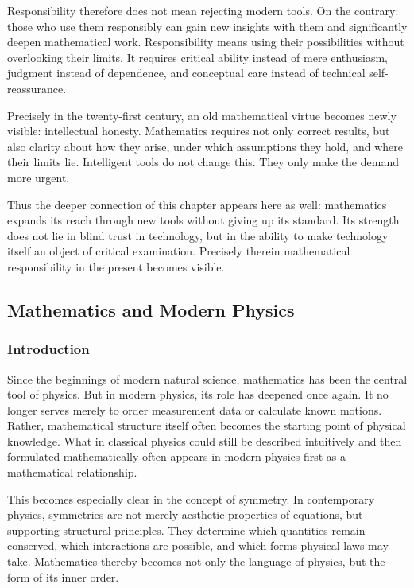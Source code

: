 Responsibility therefore does not mean rejecting modern tools.
On the contrary:
those who use them responsibly
can gain new insights with them
and significantly deepen mathematical work.
Responsibility means using their possibilities
without overlooking their limits.
It requires critical ability instead of mere enthusiasm,
judgment instead of dependence,
and conceptual care instead of technical self-reassurance.

Precisely in the twenty-first century,
an old mathematical virtue becomes newly visible:
intellectual honesty.
Mathematics requires not only correct results,
but also clarity about how they arise,
under which assumptions they hold,
and where their limits lie.
Intelligent tools do not change this.
They only make the demand more urgent.

Thus the deeper connection of this chapter appears here as well:
mathematics expands its reach through new tools
without giving up its standard.
Its strength does not lie in blind trust in technology,
but in the ability to make technology itself
an object of critical examination.
Precisely therein mathematical responsibility in the present becomes visible.


\subsection{Mathematics and Modern Physics}

\subsubsection{Introduction}

Since the beginnings of modern natural science,
mathematics has been the central tool of physics.
But in modern physics, its role has deepened once again.
It no longer serves merely to order measurement data
or calculate known motions.
Rather, mathematical structure itself often becomes
the starting point of physical knowledge.
What in classical physics could still be described intuitively
and then formulated mathematically
often appears in modern physics first as a mathematical relationship.

This becomes especially clear in the concept of symmetry.
In contemporary physics, symmetries are not merely aesthetic properties of equations,
but supporting structural principles.
They determine
which quantities remain conserved,
which interactions are possible,
and which forms physical laws may take.
Mathematics thereby becomes not only the language of physics,
but the form of its inner order.

